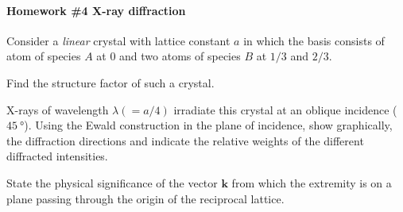 
\paragraph{Homework \#4 X-ray diffraction}

\begin{problem}
  Consider a \emph{linear} crystal with lattice constant $a$ in which the basis
  consists of atom of species $A$ at $0$ and two atoms of species $B$ at $1/3$
  and $2/3$.
  \begin{enumext}
    \item Find the structure factor of such a crystal.
    \item X-rays of wavelength $\lambda (= a/4)$ irradiate this crystal at an
    oblique incidence ($\qty{45}\degree$). Using the Ewald construction in the
    plane of incidence, show graphically, the diffraction directions and
    indicate the relative weights of the different diffracted intensities.
    \item State the physical significance of the vector $\bm k$ from which the
    extremity is on a plane passing through the origin of the reciprocal
    lattice.
  \end{enumext}
\end{problem}
